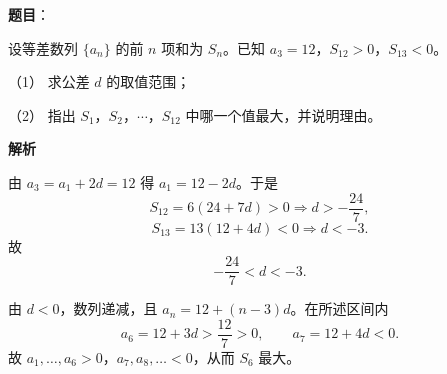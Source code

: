 \begin{answer}

\textbf{题目}：

设等差数列 \(\{a_n\}\) 的前 \(n\) 项和为 \(S_n\)。已知 \(a_3=12\)，\(S_{12}>0\)，\(S_{13}<0\)。

（1） 求公差 \(d\) 的取值范围；

（2） 指出 \(S_1\)，\(S_2\)，\(\cdots\)，\(S_{12}\) 中哪一个值最大，并说明理由。

\textbf{解析}


由 \(a_3=a_1+2d=12\) 得 \(a_1=12-2d\)。于是
\nopagebreak[4]
\[
S_{12}=6(24+7d)>0\Rightarrow d>-\frac{24}{7},
\]
\nopagebreak[4]
\[
S_{13}=13(12+4d)<0\Rightarrow d<-3.
\]
故
\nopagebreak[4]
\[
-\frac{24}{7}<d<-3.
\]


由 \(d<0\)，数列递减，且 \(a_n=12+(n-3)d\)。在所述区间内
\nopagebreak[4]
\[
a_6=12+3d>\frac{12}{7}>0,\qquad a_7=12+4d<0.
\]
故 \(a_1,\dots,a_6>0\)，\(a_7,a_8,\dots<0\)，从而 \(S_6\) 最大。



\end{answer}